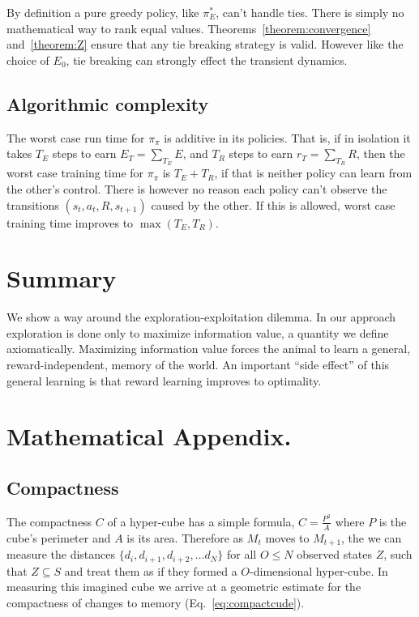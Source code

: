 \documentclass[10pt,letterpaper]{article}
\begin{document}
By definition a pure greedy policy, like $\pi^*_E$, can't handle ties. There is simply no mathematical way to rank equal values. Theorems~\ref{theorem:convergence} and~\ref{theorem:Z} ensure that any tie breaking strategy is valid. However like the choice of $E_0$, tie breaking can strongly effect the transient dynamics.

\subsection{Algorithmic complexity}
The worst case run time for $\pi_{\pi}$ is additive in its policies. That is, if in isolation it takes $T_E$ steps to earn $E_{T} = \sum_{T_E} E$, and $T_R$ steps to earn $r_{T} = \sum_{T_R} R$, then the worst case training time for $\pi_{\pi}$ is $T_E + T_R$, if that is neither policy can learn from the other's control. There is however no reason each policy can't observe the transitions $(s_t, a_t, R, s_{t+1})$ caused by the other. If this is allowed, worst case training time improves to $\max(T_E, T_R)$. 

\section{Summary}
We show a way around the exploration-exploitation dilemma. In our approach exploration is done only to maximize information value, a quantity we define axiomatically. Maximizing information value forces the animal to learn a general, reward-independent, memory of the world. An important ``side effect'' of this general learning is that reward learning improves to optimality. 


\setlength{\bibleftmargin}{.125in}
\setlength{\bibindent}{-\bibleftmargin}



\clearpage
\section{Mathematical Appendix.}
\subsection*{Compactness}
The compactness $C$ of a hyper-cube has a simple formula, $C = \frac{P^2}{A}$ where $P$ is the cube's perimeter and $A$ is its area. Therefore as $M_{t}$ moves to $M_{t+1}$, the we can measure the distances $\{d_i, d_{i+1}, d_{i+2},\ldots d_{N}\}$ for all $O \leq N$ observed states $Z$, such that $Z \subseteq S$ and treat them as if they formed a $O$-dimensional hyper-cube. In measuring this imagined cube we arrive at a geometric estimate for the compactness of changes to memory (Eq.~\ref{eq:compactcude}).
\end{document}
